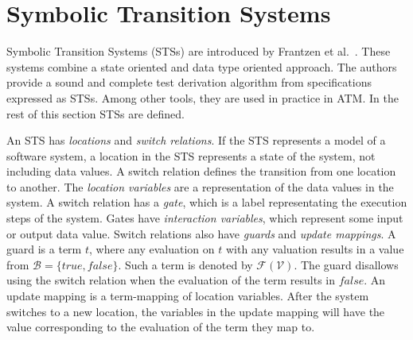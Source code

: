 \section{Symbolic Transition Systems}\label{sec:symbolic}
Symbolic Transition Systems (STSs) are introduced by Frantzen et al.~\cite{Frantzen:Symbolic}. These systems combine a state oriented and data type oriented approach. The authors provide a sound and complete test derivation algorithm from specifications expressed as STSs. Among other tools, they are used in practice in ATM. In the rest of this section STSs are defined.

An STS has \textit{locations} and \textit{switch relations}. If the STS represents a model of a software system, a location in the STS represents a state of the system, not including data values. A switch relation defines the transition from one location to another. The \textit{location variables} are a representation of the data values in the system. A switch relation has a \textit{gate}, which is a label representating the execution steps of the system. Gates have \textit{interaction variables}, which represent some input or output data value. Switch relations also have \textit{guards} and \textit{update mappings}. A guard is a term $t$, where any evaluation on $t$ with any valuation results in a value from $\mathcal{B} = \{true, false\}$. Such a term is denoted by $\mathcal{F}(\mathcal{V})$. The guard disallows using the switch relation when the evaluation of the term results in $false$. An update mapping is a term-mapping of location variables. After the system switches to a new location, the variables in the update mapping will have the value corresponding to the evaluation of the term they map to.

